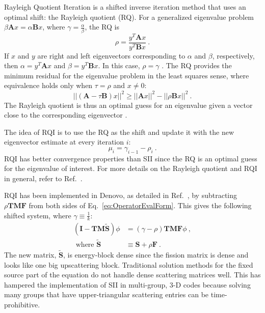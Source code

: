 \documentclass[preprint,12pt]{elsarticle}
\newcommand{\ve}[1]{\ensuremath{\mathbf{#1}}}
\begin{document}
Rayleigh Quotient Iteration is a shifted inverse iteration method %
that uses an optimal shift: the Rayleigh quotient (RQ). For a generalized eigenvalue problem $\beta \ve{A}x = \alpha \ve{B}x$, where $\gamma = \frac{\alpha}{\beta}$, the RQ is
%
\begin{equation}
  \rho = \frac{y^{T} \ve{A} x}{y^{T} \ve{B} x} \:.
  \label{eq:RQ}
\end{equation}
%
If $x$ and $y$ are right and left eigenvectors corresponding to $\alpha$ and $\beta$, respectively, then $\alpha = y^{T} \ve{A} x$ and $\beta =  y^{T} \ve{B} x$. In this case, $\rho = \gamma$ \cite{Stewart2001}. The RQ provides the minimum residual for the eigenvalue problem in the least squares sense, where equivalence holds only when $\tau = \rho$ and $x \ne 0$:
%
\begin{equation}
  ||(\ve{A} - \tau\ve{B})x||^{2} \ge ||\ve{A}x||^{2} - ||\rho\ve{B}x||^{2} \:.
\end{equation}
%
The Rayleigh quotient is thus an optimal guess for an eigenvalue given a vector close to the corresponding eigenvector \cite{Parlett1974}. 

The idea of RQI is to use the RQ as the shift and update it with the new eigenvector estimate at every iteration $i$:
%
\begin{equation}
  \mu_i = \gamma_{i-1} - \rho_i \:.
  \label{eq:Shift}
\end{equation} 
%
RQI has better convergence properties than SII since the RQ is an optimal guess for the eigenvalue of interest. For more details on the Rayleigh quotient and RQI in general, refer to Ref.\ \cite{Parlett1974}.

RQI has been implemented in Denovo, as detailed in Ref.\ \cite{Slaybaugh2012}, by subtracting $\rho \ve{TMF}$ from both sides of Eq.\ \eqref{eq:OperatorEvalForm}. This gives the following shifted system, where $\gamma \equiv \frac{1}{k}$:
%
\begin{align}
  (\ve{I} - \ve{TM}\ve{\tilde{S}})\phi &=( \gamma - \rho) \ve{TMF} \phi  \:, 
  \label{eq:OperatorShiftedEval} \\
  \text{ where } \ve{\tilde{S}} &\equiv \ve{S} + \rho\ve{F}  \nonumber \:.
\end{align}
%
The new matrix, $\ve{\tilde{S}}$, is energy-block dense since the fission matrix is dense and looks like one big upscattering block. Traditional solution methods for the fixed source part of the equation do not handle dense scattering matrices well. This has hampered the implementation of SII in multi-group, 3-D codes because solving many groups that have upper-triangular scattering entries can be time-prohibitive. 
\end{document}
